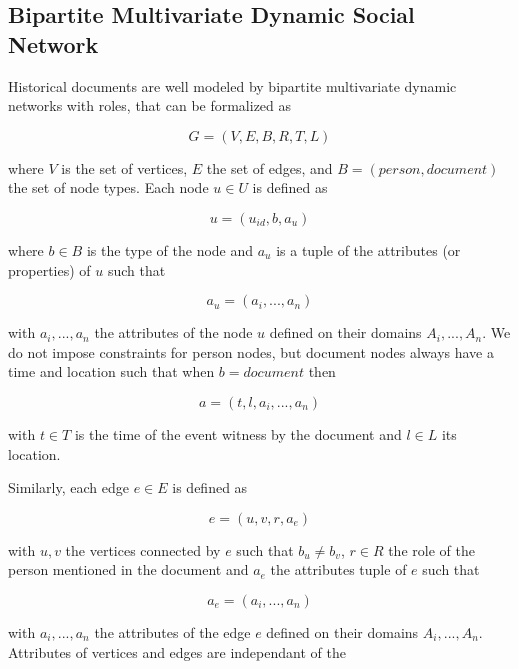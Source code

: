 \subsection{Bipartite Multivariate Dynamic Social Network}

Historical documents are well modeled by bipartite multivariate dynamic networks with roles, that can be formalized as

\begin{equation}
    G = (V, E, B, R, T, L)
\end{equation}

where $V$ is the set of vertices, $E$ the set of edges, and $B = (person, document)$ the set of node types.
Each node $u \in U$ is defined as

\begin{equation}
    u = (u_{id}, b, a_u)
\end{equation}

where $b \in B$ is the type of the node and $a_u$ is a tuple of the attributes (or properties) of $u$ such that

\begin{equation}
    a_u = (a_i, ..., a_n)
\end{equation}

with $a_i, ..., a_n$ the attributes of the node $u$ defined on their domains $A_i, ..., A_n$.
We do not impose constraints for person nodes, but document nodes always have a time and location such that when $b = document$ then

\begin{equation}
    a = (t, l, a_i, ..., a_n)
\end{equation}

with $t \in T$ is the time of the event witness by the document and $l \in L$ its location.

Similarly, each edge $e \in E$ is defined as

\begin{equation}
    e = (u, v, r, a_e)
\end{equation}

with $u, v$ the vertices connected by $e$ such that $b_u \neq b_v$, $r \in R$ the role of the person mentioned in the document and $a_e$ the attributes tuple of $e$ such that

\begin{equation}
    a_e = (a_i, ..., a_n)
\end{equation}

with $a_i, ..., a_n$ the attributes of the edge $e$ defined on their domains $A_i, ..., A_n$.
Attributes of vertices and edges are independant of the




